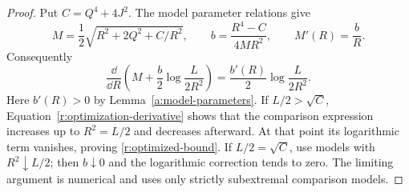 \begin{proof}
Put $C=Q^4+4J^2$.  The model parameter relations give
\[
 M=\frac12\sqrt{R^2+2Q^2+C/R^2},\qquad
 b=\frac{R^4-C}{4MR^2},\qquad M'(R)=\frac bR.
\]
Consequently
\begin{equation}\label{r:optimization-derivative}
 \frac{\dd}{\dd R}\left(M+\frac b2\log\frac{L}{2R^2}\right)
 =\frac{b'(R)}2\log\frac{L}{2R^2}.
\end{equation}
Here $b'(R)>0$ by Lemma~\ref{a:model-parameters}.
If $L/2>\sqrt C$, Equation~\eqref{r:optimization-derivative} shows
that the comparison expression increases up to $R^2=L/2$ and decreases
afterward.  At that point its logarithmic term vanishes, proving
\eqref{r:optimized-bound}.  If $L/2=\sqrt C$, use models with
$R^2\downarrow L/2$; then $b\downarrow0$ and the logarithmic correction
tends to zero.  The limiting argument is numerical and uses only
strictly subextremal comparison models.
\end{proof}
